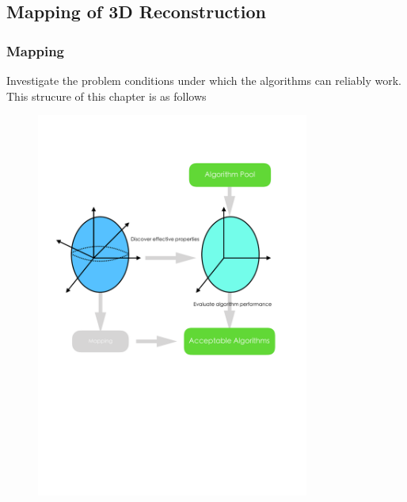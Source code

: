 \documentclass{beamer}
\begin{document}
\subsection{Mapping of 3D Reconstruction}
\begin{frame}
\frametitle{Mapping}

Investigate the problem conditions under which the algorithms can reliably work. This strucure of this chapter is as follows

\begin{figure}
\centering
\includegraphics[width=0.8\textwidth]{images/mapping_3d_vision.pdf}
\end{figure}


\end{frame}
\end{document}
